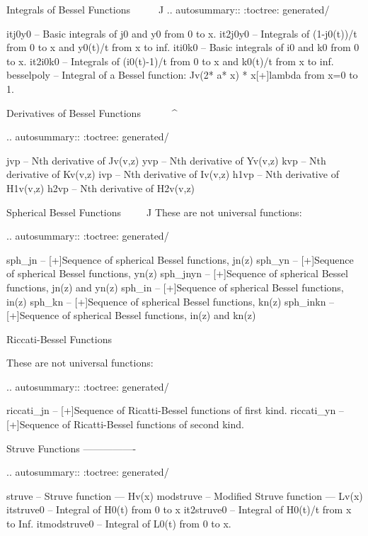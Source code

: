 \begin{DoxyVerb}
Integrals of Bessel Functions
^^^^^^^^^^^^^^^^^^^^^^^^^^^^^

.. autosummary::
   :toctree: generated/

   itj0y0     -- Basic integrals of j0 and y0 from 0 to x.
   it2j0y0    -- Integrals of (1-j0(t))/t from 0 to x and y0(t)/t from x to inf.
   iti0k0     -- Basic integrals of i0 and k0 from 0 to x.
   it2i0k0    -- Integrals of (i0(t)-1)/t from 0 to x and k0(t)/t from x to inf.
   besselpoly -- Integral of a Bessel function: Jv(2* a* x) * x[+]lambda from x=0 to 1.

Derivatives of Bessel Functions
^^^^^^^^^^^^^^^^^^^^^^^^^^^^^^^

.. autosummary::
   :toctree: generated/

   jvp     -- Nth derivative of Jv(v,z)
   yvp     -- Nth derivative of Yv(v,z)
   kvp     -- Nth derivative of Kv(v,z)
   ivp     -- Nth derivative of Iv(v,z)
   h1vp    -- Nth derivative of H1v(v,z)
   h2vp    -- Nth derivative of H2v(v,z)

Spherical Bessel Functions
^^^^^^^^^^^^^^^^^^^^^^^^^^

These are not universal functions:

.. autosummary::
   :toctree: generated/

   sph_jn   -- [+]Sequence of spherical Bessel functions, jn(z)
   sph_yn   -- [+]Sequence of spherical Bessel functions, yn(z)
   sph_jnyn -- [+]Sequence of spherical Bessel functions, jn(z) and yn(z)
   sph_in   -- [+]Sequence of spherical Bessel functions, in(z)
   sph_kn   -- [+]Sequence of spherical Bessel functions, kn(z)
   sph_inkn -- [+]Sequence of spherical Bessel functions, in(z) and kn(z)

Riccati-Bessel Functions
^^^^^^^^^^^^^^^^^^^^^^^^

These are not universal functions:

.. autosummary::
   :toctree: generated/

   riccati_jn -- [+]Sequence of Ricatti-Bessel functions of first kind.
   riccati_yn -- [+]Sequence of Ricatti-Bessel functions of second kind.

Struve Functions
----------------

.. autosummary::
   :toctree: generated/

   struve       -- Struve function --- Hv(x)
   modstruve    -- Modified Struve function --- Lv(x)
   itstruve0    -- Integral of H0(t) from 0 to x
   it2struve0   -- Integral of H0(t)/t from x to Inf.
   itmodstruve0 -- Integral of L0(t) from 0 to x.



\end{DoxyVerb}
